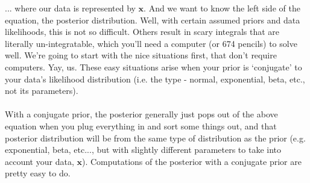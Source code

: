 \documentclass[12pt]{book}
\begin{document}
... where our data is represented by $\textbf{x}$. And we want to know the left side of the equation, the posterior distribution. Well, with certain assumed priors and data likelihoods, this is not so difficult. Others result in scary integrals that are literally un-integratable, which you'll need a computer (or 674 pencils) to solve well. We're going to start with the nice situations first, that don't require computers. Yay, us. These easy situations arise when your prior is `conjugate' to your data's likelihood distribution (i.e. the type - normal, exponential, beta, etc., not its parameters).
\\\\
With a conjugate prior, the posterior generally just pops out of the above equation when you plug everything in and sort some things out, and that posterior distribution will be from the same type of distribution as the prior (e.g. exponential, beta, etc..., but with slightly different parameters to take into account your data, $\textbf{x}$). Computations of the posterior with a conjugate prior are pretty easy to do.


\begin{adjustwidth}{2em}{0pt}
{}
\end{adjustwidth}
\end{document}
